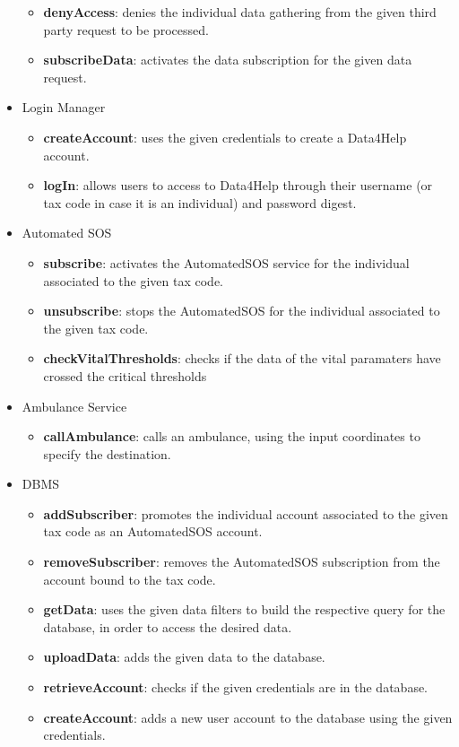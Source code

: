 \begin{itemize}
\begin{itemize}
\item \textbf{denyAccess}: denies the individual data gathering from the given third party request to be processed.
\item \textbf{subscribeData}: activates the data subscription for the given data request.
\end{itemize}
\item Login Manager
\begin{itemize}
\item \textbf{createAccount}: uses the given credentials to create a Data4Help account.
\item \textbf{logIn}: allows users to access to Data4Help through their username (or tax code in case it is an individual) and password digest.
\end{itemize}
\item Automated SOS
\begin{itemize}
\item \textbf{subscribe}: activates the AutomatedSOS service for the individual associated to the given tax code.
\item \textbf{unsubscribe}: stops the AutomatedSOS for the individual associated to the given tax code.
\item \textbf{checkVitalThresholds}: checks if the data of the vital paramaters have crossed the critical thresholds
\end{itemize}
\item Ambulance Service
\begin{itemize}
\item \textbf{callAmbulance}: calls an ambulance, using the input coordinates to specify the destination.
\end{itemize}
\item DBMS
\begin{itemize}
\item \textbf{addSubscriber}: promotes the individual account associated to the given tax code as an AutomatedSOS account.
\item \textbf{removeSubscriber}: removes the AutomatedSOS subscription from the account bound to the tax code.
\item \textbf{getData}: uses the given data filters to build the respective query for the database, in order to access the desired data.
\item \textbf{uploadData}: adds the given data to the database.
\item \textbf{retrieveAccount}: checks if the given credentials are in the database.
\item \textbf{createAccount}: adds a new user account to the database using the given credentials.

\end{itemize}
\end{itemize}
